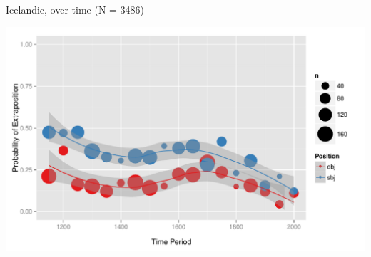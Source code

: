 \documentclass[hyperref={pdfpagelabels=false}]{beamer}
\begin{document}








\begin{frame}{Icelandic, over time (N = 3486)}

\begin{center}
\includegraphics[width=1.1\textwidth]{exSbjObjYearBinned50Loessice.pdf}
\end{center}
\end{frame}



\end{document}
